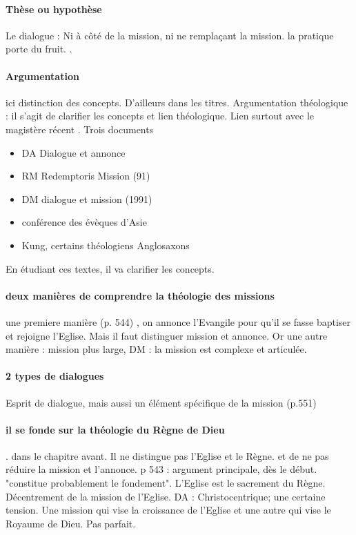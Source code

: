
\paragraph{Thèse ou hypothèse} Le dialogue : Ni à côté de la mission, ni ne remplaçant la mission. la pratique porte du fruit. .

\paragraph{Argumentation} ici distinction des concepts.  D'ailleurs dans les titres. Argumentation théologique : il s'agit de clarifier les concepts et lien théologique. Lien surtout avec le magistère récent .
Trois documents

\begin{itemize}
    \item DA Dialogue et annonce
    \item RM Redemptoris Mission (91)
    \item DM dialogue et mission (1991)
    \item conférence des évèques d'Asie
    \item Kung, certains théologiens Anglosaxons
\end{itemize}

En étudiant ces textes, il va clarifier les concepts.

\paragraph{deux manières de comprendre la théologie des missions} une premiere manière (p. 544) , on annonce l'Evangile pour qu'il se fasse baptiser et rejoigne l'Eglise. Mais il faut distinguer mission et annonce. Or une autre manière : mission plus large, DM : la mission est complexe et articulée. 

\paragraph{2 types de dialogues} Esprit de dialogue, mais aussi un élément spécifique de la mission (p.551) 

\paragraph{il se fonde sur la théologie du Règne de Dieu}. dans le chapitre avant. Il ne distingue pas l'Eglise et le Règne. et de ne pas réduire la mission et l'annonce. p 543 : argument principale, dès le début. "constitue probablement le fondement". L'Eglise est le sacrement du Règne. Décentrement de la mission de l'Eglise. 
DA : Christocentrique; une certaine tension. Une mission qui vise la croissance de l'Eglise et une autre qui vise le Royaume de Dieu. Pas parfait.

